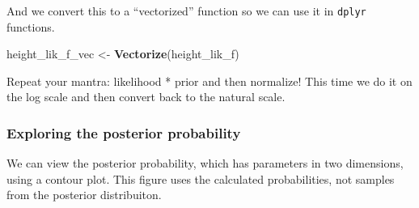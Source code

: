 \documentclass[]{article}
\newenvironment{Shaded}{\begin{snugshade}}{\end{snugshade}}
\newcommand{\DataTypeTok}[1]{\textcolor[rgb]{0.13,0.29,0.53}{#1}}
\newcommand{\DecValTok}[1]{\textcolor[rgb]{0.00,0.00,0.81}{#1}}
\newcommand{\KeywordTok}[1]{\textcolor[rgb]{0.13,0.29,0.53}{\textbf{#1}}}
\newcommand{\NormalTok}[1]{#1}
\newcommand{\OperatorTok}[1]{\textcolor[rgb]{0.81,0.36,0.00}{\textbf{#1}}}
\newcommand{\StringTok}[1]{\textcolor[rgb]{0.31,0.60,0.02}{#1}}
\begin{document}
And we convert this to a ``vectorized'' function so we can use it in
\texttt{dplyr} functions.

\begin{Shaded}
\begin{Highlighting}[]
\NormalTok{height_lik_f_vec <-}\StringTok{ }\KeywordTok{Vectorize}\NormalTok{(height_lik_f)}
\end{Highlighting}
\end{Shaded}

Repeat your mantra: likelihood * prior and then normalize! This time we
do it on the log scale and then convert back to the natural scale.

\begin{Shaded}
\end{Shaded}

\hypertarget{exploring-the-posterior-probability}{%
\subsubsection{Exploring the posterior
probability}\label{exploring-the-posterior-probability}}

We can view the posterior probability, which has parameters in two
dimensions, using a contour plot. This figure uses the calculated
probabilities, not samples from the posterior distribuiton.
\end{document}
